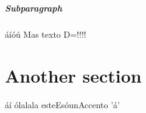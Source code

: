 \subparagraph{Subparagraph}

áíóú
Mas texto D=!!!!

\section{Another section}
áí
ólalala
esteEsóunAccento 'á'


